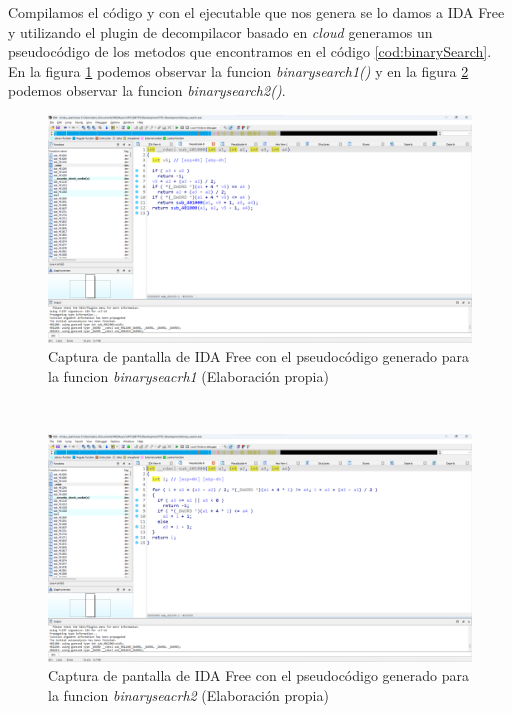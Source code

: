 Compilamos el código y con el ejecutable que nos genera se lo damos a IDA Free y utilizando el plugin de decompilacor basado en \textit{cloud} generamos un pseudocódigo de los metodos
que encontramos en el código \ref{cod:binarySearch}. En la figura \ref{fig:IDAPro_binaryseacrh1} podemos observar la funcion \textit{binarysearch1()} y en la figura \ref{fig:IDAPro_binaryseacrh2}
podemos observar la funcion \textit{binarysearch2()}.

\begin{figure} [h!]
    \begin{center}
      \includegraphics[width=15cm]{figuras/Capitulo_2/Cap_2_IDAPro_binaryseacrh1.png}
    \end{center}
    \caption[Captura de pantalla de IDA Free con el pseudocódigo generado para la funcion \textit{binaryseacrh1}]{Captura de pantalla de IDA Free con el pseudocódigo generado para la funcion \textit{binaryseacrh1} (Elaboración propia)}
    \label{fig:IDAPro_binaryseacrh1}
\end{figure}\

\begin{figure} [h!]
    \begin{center}
      \includegraphics[width=15cm]{figuras/Capitulo_2/Cap_2_IDAPro_binaryseacrh2.png}
    \end{center}
    \caption[Captura de pantalla de IDA Free con el pseudocódigo generado para la funcion \textit{binaryseacrh2}]{Captura de pantalla de IDA Free con el pseudocódigo generado para la funcion \textit{binaryseacrh2} (Elaboración propia)}
    \label{fig:IDAPro_binaryseacrh2}
\end{figure}\

